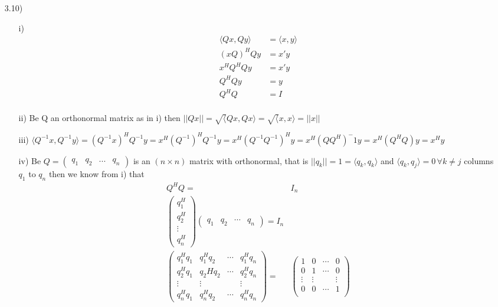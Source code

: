 \documentclass[letterpaper,12pt]{article}
\theoremstyle{definition}
\begin{document}
\begin{enumerate}
\item[3.10)]
\begin{itemize}
\item[i)] \begin{align*}
\langle Qx, Qy\rangle &= \langle x, y\rangle\\
(xQ)^HQy &=  x'y\\
x^HQ^HQy &= x'y\\
Q^HQy &=y\\
Q^HQ&= I\\
\end{align*}
\item[ii)] Be Q an orthonormal matrix as in i) then $ ||Qx|| = \sqrt{\langle} Qx, Qx \rangle  = \sqrt{\langle} x, x \rangle = ||x||$ 
\item[iii)] $\langle Q^{-1}x,Q^{-1}y  \rangle = ( Q^{-1}x)^HQ^{-1}y = x^H(Q^{-1})^HQ^{-1}y =x^H(Q^{-1}Q^{-1})^Hy = x^H(QQ^H)^-1y = x^H(Q^HQ)y=x^Hy  $
\item[iv)] Be $Q = \begin{pmatrix}
q_1 & q_2& ... & q_n\end{pmatrix}$ is an  $(n\times n)$ matrix with orthonormal, that is $ ||q_k|| = 1 = \langle q_k, q_k \rangle$ and $\langle q_k, q_j \rangle =0 \, \forall k \neq j $ columns $q_1$ to $q_n$ then we know from i) that 
\begin{align*}
Q^HQ =& I_n \\
\begin{pmatrix}
q_1^H \\ q_2^H\\ \vdots \\ q_n^H
\end{pmatrix}\begin{pmatrix}
q_1 & q_2&\cdots & q_n\end{pmatrix}=I_n\\
\begin{pmatrix}
q_1^H q_1 & q_1^H q_2 & \cdots& q_1^H q_n \\ 
q_2^H q_1 & q_2H q_2 & \cdots &q_2^H q_n\\ 
\vdots & \vdots& & \vdots \\
q_n^Hq_1 & q_n^Hq_2& \cdots& q_n^H q_n 
\end{pmatrix} =& \begin{pmatrix}
1&0&\cdots&0\\
0&1&\cdots&0\\
\vdots & \vdots& & \vdots \\
0&0&\cdots&1\\
\end{pmatrix}

\end{align*}
\end{itemize}
\end{enumerate}
\end{document}
